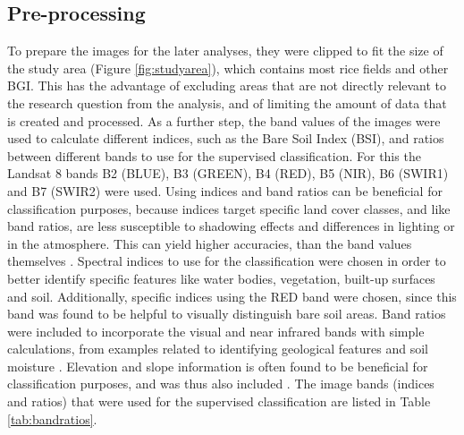 \documentclass[11pt, A4, oneside]{report}
\begin{document}
\subsection{Pre-processing}
To prepare the images for the later analyses, they were clipped to fit the size of the study area (Figure \ref{fig:studyarea}), which contains most rice fields and other BGI. This has the advantage of excluding areas that are not directly relevant to the research question from the analysis, and of limiting the amount of data that is created and processed. As a further step, the band values of the images were used to calculate different indices, such as the Bare Soil Index (BSI), and ratios between different bands to use for the supervised classification. For this the Landsat 8 bands B2 (BLUE), B3 (GREEN), B4 (RED), B5 (NIR), B6 (SWIR1) and B7 (SWIR2) were used. Using indices and band ratios can be beneficial for classification purposes, because indices target specific land cover classes, and like band ratios, are less susceptible to shadowing effects and differences in lighting or in the atmosphere. This can yield higher accuracies, than the band values themselves \parencite{Bahadur.2009, Khatami.2016}. Spectral indices to use for the classification were chosen in order to better identify specific features like water bodies, vegetation, built-up surfaces and soil. Additionally, specific indices using the RED band were chosen, since this band was found to be helpful to visually distinguish bare soil areas. Band ratios were included to incorporate the visual and near infrared bands with simple calculations, from examples related to identifying geological features and soil moisture \parencite{Mwaniki.2015, NgoThi.2019}. Elevation and slope information is often found to be beneficial for classification purposes, and was thus also included \parencite{Bahadur.2009, Jones.1988, Franklin.1987}. The image bands (indices and ratios) that were used for the supervised classification are listed in Table \ref{tab:bandratios}.

\end{document}
